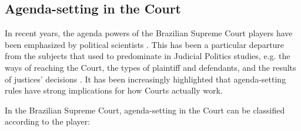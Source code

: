 \documentclass[12pt, a4paper]{article}
\begin{document}
\subsection{Agenda-setting in the Court}

In recent years, the agenda powers of the Brazilian Supreme Court players have been emphasized by political scientists \citep{hartmann2016relator, arguelhes2016supremo,arguelhes2017timing}. This has been a particular departure from the subjects that used to predominate in Judicial Politics studies, e.g. the ways of reaching the Court, the types of plaintiff and defendants, and the results of justices' decisions \citep[for instance]{arantes1997judiciario,taylor2008judging,oliveira2012decision}. It has been increasingly highlighted that agenda-setting rules have strong implications for how
Courts actually work.

In the Brazilian Supreme Court, agenda-setting in the Court can be classified according to the player:
\end{document}
